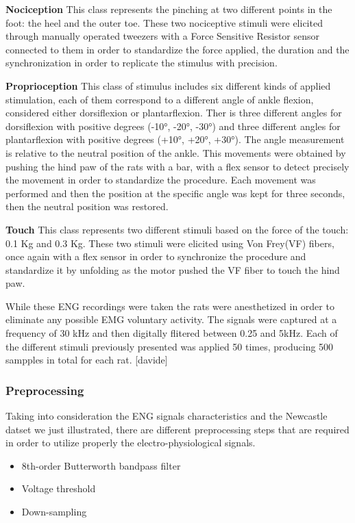 \documentclass{Configuration_Files/PoliMi3i_thesis}
\begin{document}
\textbf{Nociception} \quad This class represents the pinching at two different points in the foot: the heel and the outer toe.
These two nociceptive stimuli were elicited through manually operated tweezers with a Force Sensitive Resistor sensor connected to them in order to standardize the force applied, the duration and the synchronization in order to replicate the stimulus with precision.

\textbf{Proprioception} \quad This class of stimulus includes six different kinds of applied stimulation, each of them correspond to a different angle of ankle flexion, considered either dorsiflexion or plantarflexion.
Ther is three different angles for dorsiflexion with positive degrees (-10°, -20°, -30°) and three different angles for plantarflexion with positive degrees (+10°, +20°, +30°).
The angle measurement is relative to the neutral position of the ankle.
This movements were obtained by pushing the hind paw of the rats with a bar, with a flex sensor to detect precisely the movement in order to standardize the procedure.
Each movement was performed and then the position at the specific angle was kept for three seconds, then the neutral position was restored.

\textbf{Touch} \quad This class represents two different stimuli based on the force of the touch: 0.1 Kg and 0.3 Kg.
These two stimuli were elicited using Von Frey(VF) fibers, once again with a flex sensor in order to synchronize the procedure and standardize it by unfolding as the motor pushed the VF fiber to touch the hind paw.

While these ENG recordings were taken the rats were anesthetized in order to eliminate any possible EMG voluntary activity. The signals were captured at a frequency of 30 kHz and then digitally flitered between 0.25 and 5kHz.
Each of the different stimuli previously presented was applied 50 times, producing 500 sampples in total for each rat. [davide]

\subsubsection{Preprocessing}

Taking into consideration the ENG signals characteristics and the Newcastle datset we just illustrated, there are different preprocessing steps that are required in order to utilize properly the electro-physiological signals.

\begin{itemize}
	\item 8th-order Butterworth bandpass filter
	\item Voltage threshold
	\item Down-sampling
\end{itemize}
\end{document}
